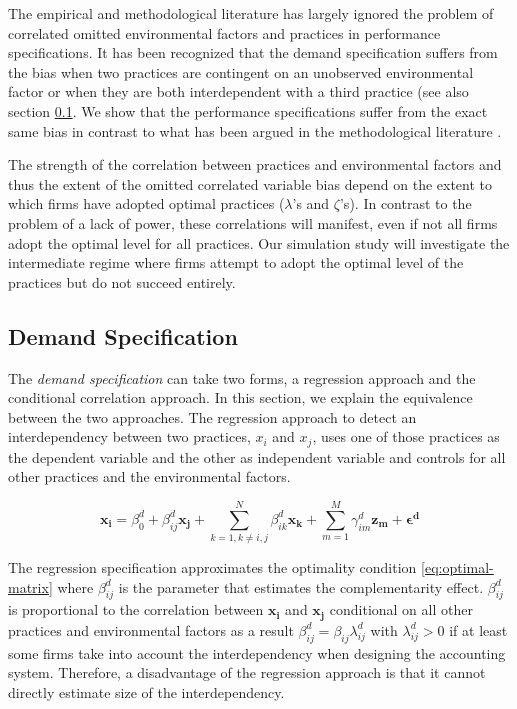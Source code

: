\documentclass[12pt]{article}
\begin{document}
The empirical and methodological literature has largely ignored the problem of correlated omitted environmental factors and practices in performance specifications. It has been recognized that the demand specification suffers from the bias when two practices are contingent on an unobserved environmental factor or when they are both interdependent with a third practice (see also section \ref{demand-specification}. We show that the performance specifications suffer from the exact same bias in contrast to what has been argued in the methodological literature \citep{Carree2011}. 

The strength of the correlation between practices and environmental factors and thus the extent of the omitted correlated variable bias depend on the extent to which firms have adopted optimal practices ($\lambda$'s and $\zeta$'s). In contrast to the problem of a lack of power, these correlations will manifest, even if not all firms adopt the optimal level for all practices. Our simulation study will investigate the intermediate regime where firms attempt to adopt the optimal level of the practices but do not succeed entirely.

\subsection{Demand Specification}\label{demand-specification}

The \emph{demand specification} can take two forms, a regression approach and the conditional correlation approach. In this section, we explain the equivalence between the two approaches. The regression  approach to detect an interdependency between two practices, $x_i$ and $x_j$, uses one of those practices as the dependent variable and the other as independent variable and controls for all other practices and the environmental factors.

\begin{equation} \label{eq:demand-specification}
\mathbf{x_i} = \beta_0^d + \beta_{ij}^d \mathbf{x_j} 
		+ \sum_{k = 1, k \neq i,j}^N \beta_{ik}^d \mathbf{x_k} 
        + \sum_{m = 1}^M \gamma_{im}^d \mathbf{z_m}
        + \mathbf{\epsilon^d}
\end{equation}

The regression specification approximates the optimality condition  \eqref{eq:optimal-matrix} where \(\beta^d_{ij}\) is the parameter that estimates the complementarity effect. $\beta_{ij}^d$ is proportional to the  correlation between $\mathbf{x_i}$ and $\mathbf{x_j}$ conditional on all other practices and environmental factors as a result  $\beta^d_{ij} = \beta_{ij} \lambda^d_{ij}$ with $\lambda^d_{ij} > 0$ if at least some firms take into account the interdependency when designing the accounting system. Therefore, a disadvantage of the regression approach is that it cannot directly estimate size of the interdependency.
\end{document}
